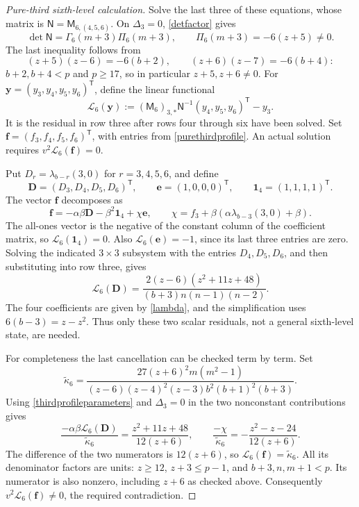 \documentclass[12pt]{article}
\theoremstyle{remark}
\begin{document}
\begin{proof}[Pure-third sixth-level calculation]
Solve the last three of these equations, whose matrix is
$\mathsf N=\mathsf M_{6,(4,5,6)}$.  On $\Delta_3=0$, \eqref{detfactor} gives
\[
 \det\mathsf N=\Gamma_6(m+3)\Pi_6(m+3),\qquad
 \Pi_6(m+3)=-6(z+5)\ne0.
\]
The last inequality follows from
\[
 (z+5)(z-6)=-6(b+2),\qquad
 (z+6)(z-7)=-6(b+4):
\]
$b+2,b+4<p$ and $p\ge17$, so in particular $z+5,z+6\ne0$.
For $\mathbf y=(y_3,y_4,y_5,y_6)^{\mathsf T}$, define the linear
functional
\[
 \mathcal L_6(\mathbf y):=(\mathsf M_6)_{3,*}\mathsf N^{-1}
      (y_4,y_5,y_6)^{\mathsf T}-y_3.
\]
It is the residual in row three after rows four through six have been
solved.  Set $\mathbf f=(f_3,f_4,f_5,f_6)^{\mathsf T}$, with entries
from \eqref{purethirdprofile}.  An actual solution requires
$v^2\mathcal L_6(\mathbf f)=0$.

Put $D_r=\lambda_{b-r}(3,0)$ for $r=3,4,5,6$, and define
\[
 \mathbf D=(D_3,D_4,D_5,D_6)^{\mathsf T},\qquad
 \mathbf e=(1,0,0,0)^{\mathsf T},\qquad
 \mathbf 1_4=(1,1,1,1)^{\mathsf T}.
\]
The vector $\mathbf f$ decomposes as
\[
 \mathbf f=-\alpha\beta\mathbf D-\beta^2\mathbf 1_4+\chi\mathbf e,\qquad
 \chi=f_3+\beta(\alpha\lambda_{b-3}(3,0)+\beta).
\]
The all-ones vector is the negative of the constant column of the
coefficient matrix, so
$\mathcal L_6(\mathbf 1_4)=0$.  Also $\mathcal L_6(\mathbf e)=-1$, since its last
three entries are zero.  Solving the indicated $3\times3$ subsystem with the entries $D_4,D_5,D_6$, and then substituting into row three, gives
\[
 \mathcal L_6(\mathbf D)=\frac{2(z-6)(z^2+11z+48)}
                       {(b+3)n(n-1)(n-2)}.
\]
The four coefficients are given by \eqref{lambda}, and the
simplification uses $6(b-3)=z-z^2$.  Thus only these two scalar
residuals, not a general sixth-level state, are needed.

For completeness the last cancellation can be checked term by term.
Set
\begin{equation}\label{vK6}
 \widetilde\kappa_6=
 \frac{27(z+6)^2m(m^2-1)}
 {(z-6)(z-4)^2(z-3)b^2(b+1)^2(b+3)}.
\end{equation}
Using \eqref{thirdprofileparameters} and $\Delta_3=0$ in the two
nonconstant contributions gives
\[
 \frac{-\alpha\beta\mathcal L_6(\mathbf D)}{\widetilde\kappa_6}
       =\frac{z^2+11z+48}{12(z+6)},\qquad
 \frac{-\chi}{\widetilde\kappa_6}
       =-\frac{z^2-z-24}{12(z+6)}.
\]
The difference of the two numerators is $12(z+6)$, so
$\mathcal L_6(\mathbf f)=\widetilde\kappa_6$.  All its denominator factors are
units: $z\ge12$, $z+3\le p-1$, and $b+3,n,m+1<p$.
Its numerator is also nonzero, including $z+6$ as checked above.
Consequently $v^2\mathcal L_6(\mathbf f)\ne0$, the required contradiction.
\end{proof}
\end{document}
